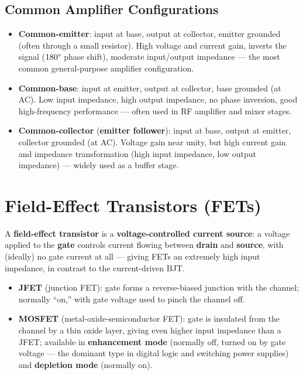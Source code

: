 \subsection{Common Amplifier Configurations}

\begin{itemize}
\item \textbf{Common-emitter}: input at base, output at collector,
emitter grounded (often through a small resistor). High voltage and
current gain, inverts the signal ($180\degree$ phase shift), moderate
input/output impedance --- the most common general-purpose amplifier
configuration.
\item \textbf{Common-base}: input at emitter, output at collector, base
grounded (at AC). Low input impedance, high output impedance, no phase
inversion, good high-frequency performance --- often used in RF
amplifier and mixer stages.
\item \textbf{Common-collector} (\textbf{emitter follower}): input at
base, output at emitter, collector grounded (at AC). Voltage gain near
unity, but high current gain and impedance transformation (high input
impedance, low output impedance) --- widely used as a buffer stage.
\end{itemize}

\section{Field-Effect Transistors (FETs)}

A \textbf{field-effect transistor} is a \textbf{voltage-controlled
current source}: a voltage applied to the \textbf{gate} controls current
flowing between \textbf{drain} and \textbf{source}, with (ideally) no
gate current at all --- giving FETs an extremely high input impedance,
in contrast to the current-driven BJT.

\begin{itemize}
\item \textbf{JFET} (junction FET): gate forms a reverse-biased junction
with the channel; normally ``on,'' with gate voltage used to pinch the
channel off.
\item \textbf{MOSFET} (metal-oxide-semiconductor FET): gate is insulated
from the channel by a thin oxide layer, giving even higher input
impedance than a JFET; available in \textbf{enhancement mode} (normally
off, turned on by gate voltage --- the dominant type in digital logic
and switching power supplies) and \textbf{depletion mode} (normally on).
\end{itemize}

